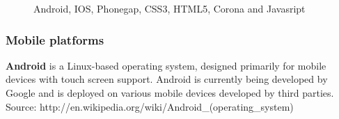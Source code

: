\begin{figure}[!ht]
{}
\caption{Android, IOS, Phonegap, CSS3, HTML5, Corona and Javasript}
\end{figure}

\subsubsection{Mobile platforms}
{\bf Android} is a Linux-based operating system, designed primarily for mobile
devices with touch screen support. Android is currently being developed by
Google and is deployed on various mobile devices developed by third parties.
Source: http://en.wikipedia.org/wiki/Android_(operating_system)
\linebreak

